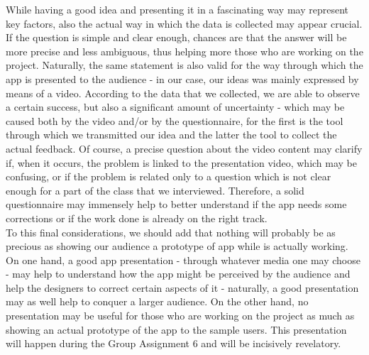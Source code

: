 \documentclass[12pt]{scrartcl}
\begin{document}
	While having a good idea and presenting it in a fascinating way may represent key factors, also the actual way in which the data is collected may appear crucial. If the question is simple and clear enough, chances are that the answer will be more precise and less ambiguous, thus helping more those who are working on the project. Naturally, the same statement is also valid for the way through which the app is presented to the audience - in our case, our ideas was mainly expressed by means of a video. According to the data that we collected, we are able to observe a certain success, but also a significant amount of uncertainty - which may be caused both by the video and/or by the questionnaire, for the first is the tool through which we transmitted our idea and the latter the tool to collect the actual feedback. Of course, a precise question about the video content may clarify if, when it occurs, the problem is linked to the presentation video, which may be confusing, or if the problem is related only to a question which is not clear enough for a part of the class that we interviewed. Therefore, a solid questionnaire may immensely help to better understand if the app needs some corrections or if the work done is already on the right track.\\
  
	To this final considerations, we should add that nothing will probably be as precious as showing our audience a prototype of app while is actually working. On one hand, a good app presentation - through whatever media one may choose - may help to understand how the app might be perceived by the audience and help the designers to correct certain aspects of it - naturally, a good presentation may as well help to conquer a larger audience. On the other hand, no presentation may be useful for those who are working on the project as much as showing an actual prototype of the app to the sample users. This presentation will happen during the Group Assignment 6 and will be incisively revelatory. 
\end{document}
